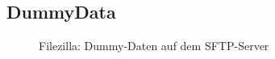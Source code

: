 \subsection{DummyData}
\label{app:DummyData}
\begin{figure}[htb]
\centering
{}
\caption{Filezilla: Dummy-Daten auf dem SFTP-Server}
\end{figure}
\clearpage